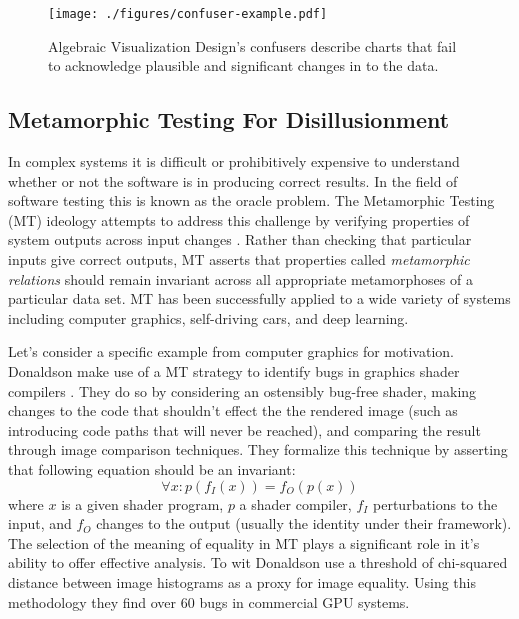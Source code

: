 



\begin{figure}[bth]
   \centering
   \texttt{[image: ./figures/confuser-example.pdf]}
   \caption{Algebraic Visualization Design's confusers describe charts that fail to acknowledge plausible and significant changes in to the data.}
   \label{fig:confuser-example}
\end{figure}



\subsection{Metamorphic Testing For Disillusionment}


In complex systems it is difficult or prohibitively expensive to understand whether or not the software is in producing correct results. In the field of software testing this is known as the oracle problem. The Metamorphic Testing (MT) ideology attempts to address this challenge by verifying properties of system outputs across input changes \cite{segura2016survey}. Rather than checking that particular inputs give correct outputs, MT asserts that properties called \textit{metamorphic relations} should remain invariant across all appropriate metamorphoses of a particular data set. MT has been successfully applied to a wide variety of systems including computer graphics, self-driving cars, and deep learning.

Let's consider a specific example from computer graphics for motivation.  Donaldson \etal make use of a MT strategy to identify bugs in graphics shader compilers \cite{metamorphicoopsla17}. They do so by considering an ostensibly bug-free shader, making changes to the code that shouldn't effect the the rendered image (such as introducing code paths that will never be reached), and comparing the result through image comparison techniques.  They formalize this technique by asserting that following equation should be an invariant:
    \begin{equation}\label{equation:shader}
        \forall x: p(f_I (x)) = f_O (p(x))
    \end{equation}
where $x$ is a given shader program, $p$ a shader compiler, $f_I$  perturbations to the input, and $f_O$ changes to the output (usually the identity under their framework). The selection of the meaning of equality in MT plays a significant role in it's ability to offer effective analysis. To wit Donaldson \etal use a threshold of chi-squared distance between image histograms as a proxy for image equality. Using this methodology they find over 60 bugs in commercial GPU systems.


